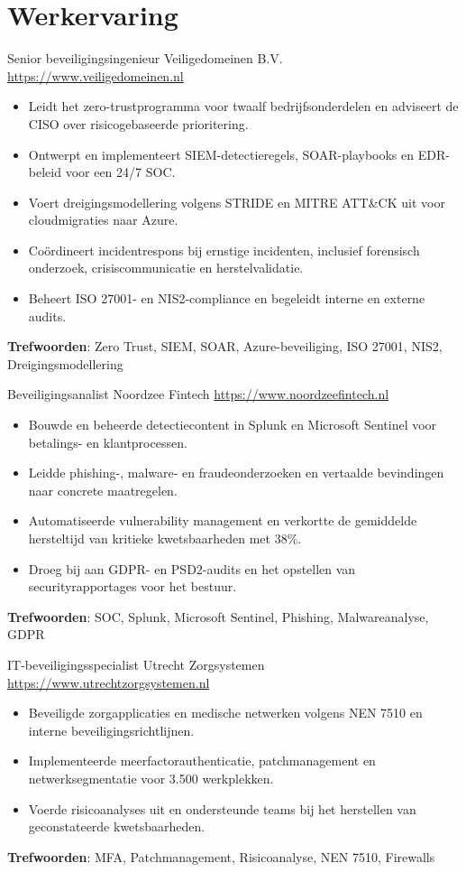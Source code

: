 \documentclass[a4paper, serif, 10pt]{moderncv}
\begin{document}
\section{Werkervaring}

        {Senior beveiligingsingenieur}
        {Veiligedomeinen B.V.}
        {\url{https://www.veiligedomeinen.nl}}
        {}
        {\begin{itemize}
\item Leidt het zero-trustprogramma voor twaalf bedrijfsonderdelen en adviseert de CISO over risicogebaseerde prioritering.
\item Ontwerpt en implementeert SIEM-detectieregels, SOAR-playbooks en EDR-beleid voor een 24/7 SOC.
\item Voert dreigingsmodellering volgens STRIDE en MITRE ATT\&CK uit voor cloudmigraties naar Azure.
\item Coördineert incidentrespons bij ernstige incidenten, inclusief forensisch onderzoek, crisiscommunicatie en herstelvalidatie.
\item Beheert ISO 27001- en NIS2-compliance en begeleidt interne en externe audits.
\end{itemize}
\textbf{Trefwoorden}: Zero Trust, SIEM, SOAR, Azure-beveiliging, ISO 27001, NIS2, Dreigingsmodellering}

        {Beveiligingsanalist}
        {Noordzee Fintech}
        {\url{https://www.noordzeefintech.nl}}
        {}
        {\begin{itemize}
\item Bouwde en beheerde detectiecontent in Splunk en Microsoft Sentinel voor betalings- en klantprocessen.
\item Leidde phishing-, malware- en fraudeonderzoeken en vertaalde bevindingen naar concrete maatregelen.
\item Automatiseerde vulnerability management en verkortte de gemiddelde hersteltijd van kritieke kwetsbaarheden met 38\%.
\item Droeg bij aan GDPR- en PSD2-audits en het opstellen van securityrapportages voor het bestuur.
\end{itemize}
\textbf{Trefwoorden}: SOC, Splunk, Microsoft Sentinel, Phishing, Malwareanalyse, GDPR}

        {IT-beveiligingsspecialist}
        {Utrecht Zorgsystemen}
        {\url{https://www.utrechtzorgsystemen.nl}}
        {}
        {\begin{itemize}
\item Beveiligde zorgapplicaties en medische netwerken volgens NEN 7510 en interne beveiligingsrichtlijnen.
\item Implementeerde meerfactorauthenticatie, patchmanagement en netwerksegmentatie voor 3.500 werkplekken.
\item Voerde risicoanalyses uit en ondersteunde teams bij het herstellen van geconstateerde kwetsbaarheden.
\end{itemize}
\textbf{Trefwoorden}: MFA, Patchmanagement, Risicoanalyse, NEN 7510, Firewalls}
\end{document}
